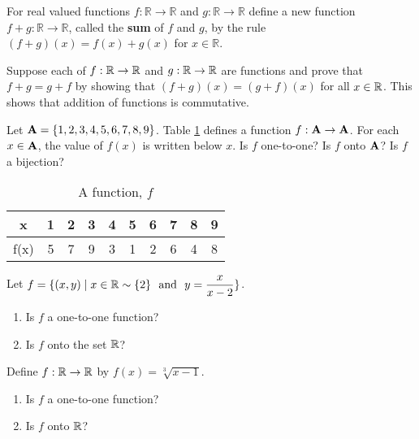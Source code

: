 \begin{dfn}
For real valued functions $f:\mathbb R \to \mathbb R$ and $g:\mathbb R \to \mathbb R$ define a new function $f+g:\mathbb R \to \mathbb R$, called the \textbf{sum} of $f$ and $g$, by the rule $(f+g)(x) = f(x) + g(x)$ for $x\in \mathbb R$.
\end{dfn}

\begin{prb}
Suppose each of $f: \mathbb R \to \mathbb R$ and $g: \mathbb R \to \mathbb R$ are functions and prove that $f+g = g+f$ by showing that $(f+g)(x) = (g+f)(x)$ for all $x \in \mathbb R$.  This
shows that addition of functions is commutative.
\end{prb}

\begin{prb}
Let $\mathbf A = \{1,2,3,4,5,6,7,8,9\}$.  Table \ref{t1} defines a function $f:\mathbf A \to \mathbf A$. For each $x \in \mathbf A$, the value of $f(x)$ is written below $x$. Is $f$ one-to-one? Is $f$ onto $\mathbf A$? Is $f$ a bijection?
\end{prb}
\begin{table}[ht]

   \begin{center}
     \begin{tabular}{|| c || c | c | c | c | c | c | c | c | c ||}
     \hline
    x    & 1 & 2 & 3 & 4 & 5 & 6 & 7 & 8 & 9      \\ \hline
    f(x) & 5 & 7 & 9 & 3 & 1 & 2 & 6 & 4 & 8    \\ \hline
    \end{tabular}
   \end{center}
   \caption{A function, $f$}
   \label{t1}
  \end{table}

\begin{prb}
Let $\displaystyle f = \{ (x,y)  \mid  x \in \mathbb R \sim \{2\} \ \mbox{ and } \ y = \frac{x}{x-2} \}$.
\begin{enumerate}
\item Is $f$ a one-to-one function?
\item Is $f$ onto the set $\mathbb R$?
\end{enumerate}
\end{prb}

\begin{prb}
Define $f : \mathbb R \to \mathbb R$ by $f(x) = \sqrt[3]{x-1}$.
\begin{enumerate}
\item Is $f$ a one-to-one function?
\item Is $f$ onto $\mathbb R$?
\end{enumerate}
\end{prb}

